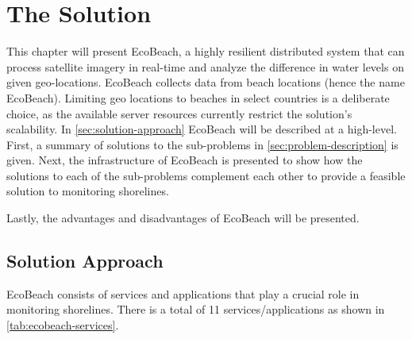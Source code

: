 \chapter{The Solution}

This chapter will present EcoBeach, a highly resilient distributed system that can process satellite imagery in real-time and analyze the difference in water levels on given geo-locations.
EcoBeach collects data from beach locations (hence the name EcoBeach). Limiting geo locations to beaches in select countries is a deliberate choice, as the available server resources currently restrict the solution's scalability. \medbreak
\noindent
In \autoref{sec:solution-approach}  EcoBeach will be described at a high-level. First, a summary of solutions to the sub-problems in \autoref{sec:problem-description} is given. Next, the infrastructure of EcoBeach is presented to show how the solutions to each of the sub-problems complement each other to provide a feasible solution to monitoring shorelines.

Lastly, the advantages and disadvantages of EcoBeach will be presented.

\section{Solution Approach}\label{sec:solution-approach}

EcoBeach consists of services and applications that play a crucial role in monitoring shorelines. There is a total of 11 services/applications as shown in \autoref{tab:ecobeach-services}.

